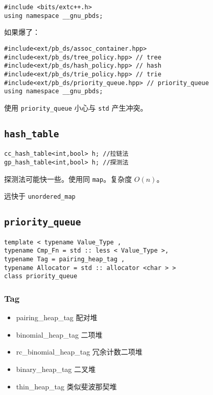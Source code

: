 \documentclass[]{article}
\providecommand{\tightlist}{%
  \setlength{\itemsep}{0pt}\setlength{\parskip}{0pt}}
\begin{document}
\begin{verbatim}
#include <bits/extc++.h>
using namespace __gnu_pbds;
\end{verbatim}

如果爆了：

\begin{verbatim}
#include<ext/pb_ds/assoc_container.hpp>
#include<ext/pb_ds/tree_policy.hpp> // tree
#include<ext/pb_ds/hash_policy.hpp> // hash
#include<ext/pb_ds/trie_policy.hpp> // trie
#include<ext/pb_ds/priority_queue.hpp> // priority_queue
using namespace __gnu_pbds;
\end{verbatim}

使用 \texttt{priority\_queue} 小心与 \texttt{std} 产生冲突。

\hypertarget{hash_table}{%
\subsection{\texorpdfstring{\texttt{hash\_table}}{hash\_table}}\label{hash_table}}

\begin{verbatim}
cc_hash_table<int,bool> h; //拉链法
gp_hash_table<int,bool> h; //探测法
\end{verbatim}

探测法可能快一些。使用同 \texttt{map}。复杂度 \(O(n)\)。

远快于 \texttt{unordered\_map}

\hypertarget{priority_queue}{%
\subsection{\texorpdfstring{\texttt{priority\_queue}}{priority\_queue}}\label{priority_queue}}

\begin{verbatim}
template < typename Value_Type ,
typename Cmp_Fn = std :: less < Value_Type >,
typename Tag = pairing_heap_tag ,
typename Allocator = std :: allocator <char > >
class priority_queue
\end{verbatim}

\hypertarget{tag}{%
\subsubsection{Tag}\label{tag}}

\begin{itemize}
\tightlist
\item
  pairing\_heap\_tag 配对堆
\item
  binomial\_heap\_tag 二项堆
\item
  rc\_binomial\_heap\_tag 冗余计数二项堆
\item
  binary\_heap\_tag 二叉堆
\item
  thin\_heap\_tag 类似斐波那契堆
\end{itemize}
\end{document}
